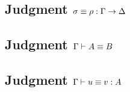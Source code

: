\documentclass{article}
\begin{document}
\eqctxRulesParanoid

\subsection{Judgment $\sigma \equiv \rho : \Gamma \to \Delta$}

\eqsubstRulesParanoid

\subsection{Judgment $\Gamma \vdash A \equiv B$}

\eqtypeRulesParanoid

\subsection{Judgment $\Gamma \vdash u \equiv v : A$}

\eqtermRulesParanoid
\end{document}
